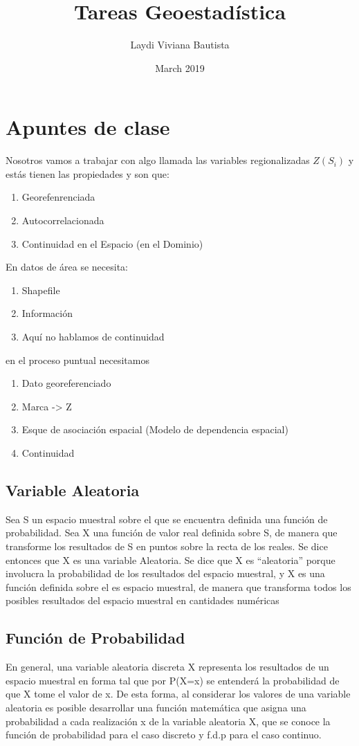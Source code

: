 \documentclass{book}
\title{Tareas Geoestadística}
\author{Laydi Viviana Bautista}
\date{March 2019}
\begin{document}
\chapter{Apuntes de clase}





Nosotros vamos a trabajar con algo llamada las variables regionalizadas $Z(S_i)$ y estás tienen las propiedades y son que: \begin{enumerate}
    \item Georefenrenciada
    \item Autocorrelacionada
    \item Continuidad en el Espacio (en el Dominio)
\end{enumerate}

En datos de área se necesita: 
\begin{enumerate}
    \item Shapefile
    \item Información
    \item Aquí no hablamos de continuidad
\end{enumerate}

en el proceso puntual necesitamos 
\begin{enumerate}
    \item Dato georeferenciado
    \item Marca -> Z
    \item Esque de asociación espacial (Modelo de dependencia espacial)
    \item Continuidad
\end{enumerate}




\section{Variable Aleatoria} Sea S un espacio muestral sobre el que se encuentra definida una función de probabilidad. Sea X una función de valor real definida sobre S, de manera que transforme los resultados de S en puntos sobre la recta de los reales. Se dice entonces que X es una variable Aleatoria.
Se dice que X es “aleatoria” porque involucra la probabilidad de los resultados del espacio muestral, y X es una función definida sobre el es espacio muestral, de manera que transforma todos los posibles resultados del espacio muestral en cantidades numéricas

\section{Función de Probabilidad}
En general, una variable aleatoria discreta X representa los resultados de un espacio muestral en forma tal que por P(X=x) se entenderá la probabilidad de que X tome el valor de x. De esta forma, al considerar los valores de una variable aleatoria es posible desarrollar una función matemática que asigna una probabilidad a cada realización x de la variable aleatoria X, que se conoce la función de probabilidad para el caso discreto y f.d.p para el caso continuo. 
\end{document}
